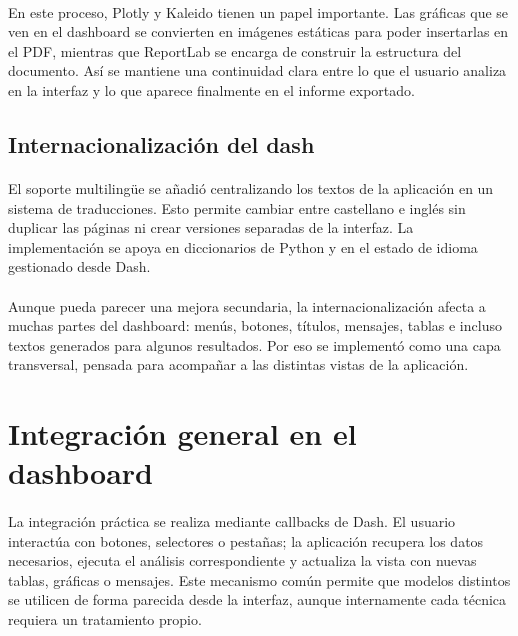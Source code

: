 \paragraph*{}
En este proceso, Plotly y Kaleido tienen un papel importante. Las gráficas que se ven en el dashboard se convierten en imágenes estáticas para poder insertarlas en el PDF, mientras que ReportLab se encarga de construir la estructura del documento. Así se mantiene una continuidad clara entre lo que el usuario analiza en la interfaz y lo que aparece finalmente en el informe exportado.

\subsection{Internacionalización del dash}

\paragraph*{}
El soporte multilingüe se añadió centralizando los textos de la aplicación en un sistema de traducciones. Esto permite cambiar entre castellano e inglés sin duplicar las páginas ni crear versiones separadas de la interfaz. La implementación se apoya en diccionarios de Python y en el estado de idioma gestionado desde Dash.

\paragraph*{}
Aunque pueda parecer una mejora secundaria, la internacionalización afecta a muchas partes del dashboard: menús, botones, títulos, mensajes, tablas e incluso textos generados para algunos resultados. Por eso se implementó como una capa transversal, pensada para acompañar a las distintas vistas de la aplicación.

\section{Integración general en el dashboard}

\paragraph*{}
La integración práctica se realiza mediante callbacks de Dash. El usuario interactúa con botones, selectores o pestañas; la aplicación recupera los datos necesarios, ejecuta el análisis correspondiente y actualiza la vista con nuevas tablas, gráficas o mensajes. Este mecanismo común permite que modelos distintos se utilicen de forma parecida desde la interfaz, aunque internamente cada técnica requiera un tratamiento propio.

